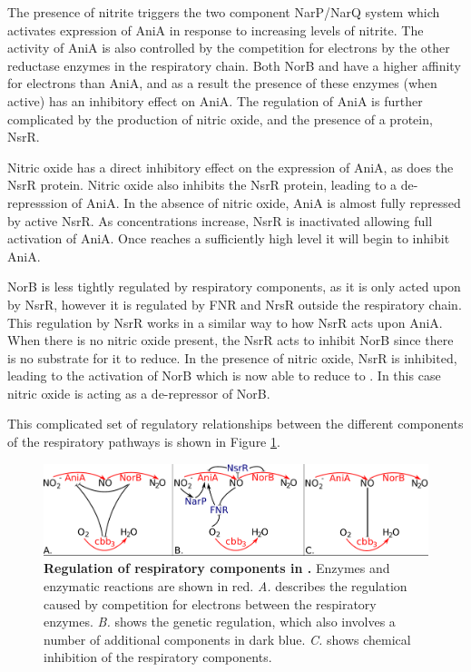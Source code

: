 The presence of nitrite triggers the two component NarP/NarQ system which activates expression of AniA in response to increasing levels of nitrite\cite{Rock2005}. The activity of AniA is also controlled by the competition for electrons by the other reductase enzymes in the respiratory chain. Both NorB and \cbbthree{} have a higher affinity for electrons than AniA, and as a result the presence of these enzymes (when active) has an inhibitory effect on AniA. The regulation of AniA is further complicated by the production of nitric oxide, and the presence of a protein, NsrR.

Nitric oxide has a direct inhibitory effect on the expression of AniA, as does the NsrR protein. Nitric oxide also inhibits the NsrR protein, leading to a de-represssion of AniA\cite{Heurlier2008}. In the absence of nitric oxide, AniA is almost fully repressed by active NsrR. As \cNO{} concentrations increase, NsrR is inactivated allowing full activation of AniA. Once \cNO{} reaches a sufficiently high level it will begin to inhibit AniA\cite{Rock2005,Rock2007}.

NorB is less tightly regulated by respiratory components, as it is only acted upon by NsrR, however it is regulated by FNR and NrsR outside the respiratory chain\cite{Isabella2008}. This regulation by NsrR works in a similar way to how NsrR acts upon AniA. When there is no nitric oxide present, the NsrR acts to inhibit NorB since there is no substrate for it to reduce. In the presence of nitric oxide, NsrR is inhibited, leading to the activation of NorB which is now able to reduce \cNO{} to \cNtwoO{}. In this case nitric oxide is acting as a de-repressor of NorB.

This complicated set of regulatory relationships between the different components of the respiratory pathways is shown in Figure \ref{fig:respiratory-pathway}.

\begin{figure}[tbp]
 \begin{center}
 \includegraphics[width=14cm]{./01-introduction/data/regulation.pdf}
\end{center}
\caption[{Regulation of respiratory components in \Nsm{}.}]{{\bf Regulation of respiratory components in \Nsm{}.} Enzymes and enzymatic reactions are shown in red. \textit{A.} describes the regulation caused by competition for electrons between the respiratory enzymes. \textit{B.} shows the genetic regulation, which also involves a number of additional components in dark blue. \textit{C.} shows chemical inhibition of the respiratory components.
\label{fig:respiratory-pathway}}
\end{figure}

